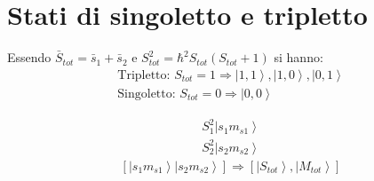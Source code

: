 
\chapter{Stati di singoletto e tripletto} %
Essendo $\bar S_{tot}=\bar s_1+\bar s_2$ e $S^2_{tot}=\hbar ^2S_{tot}\left(S_{tot}+1\right)$ si hanno:
\begin{equation}\begin{split}
\textrm{Tripletto: } S_{tot}=1 \Longrightarrow \left |1,1 \right\rangle, \left |1,0 \right\rangle, \left |0,1 \right\rangle\\
\textrm{Singoletto: } S_{tot}=0 \Longrightarrow \left |0,0 \right\rangle
\end{split}\end{equation}

\begin{equation}\begin{split}
S_1^2\left |s_1m_{s1} \right\rangle\\
S_2^2\left |s_2m_{s2} \right\rangle
\end{split}\end{equation}
\begin{equation}\begin{split}
\left[\left |s_1m_{s1} \right\rangle\left |s_2m_{s2} \right\rangle\right]\Longrightarrow \left[\left |S_{tot} \right\rangle,\left |M_{tot} \right\rangle\right]
\end{split}\end{equation}


